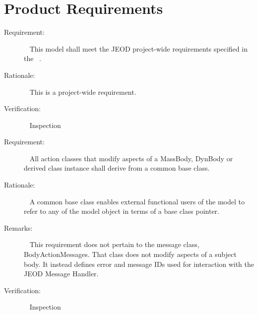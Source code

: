 %

\chapter{Product Requirements}
\label{ch:overview:reqt}

\label{reqt:overview:top_level}
\begin{description}
\item[Requirement:]\ \newline
  This model shall meet the JEOD project-wide requirements specified in
  the \JEODid\ .

\item[Rationale:]\ \newline
  This is a project-wide requirement.

\item[Verification:]\ \newline
  Inspection
\end{description}


\label{reqt:overview:base_class}
\begin{description}
\item[Requirement:]\ \newline
  All action classes that modify aspects of a MassBody, DynBody or derived class instance
  shall derive from a common base class.

\item[Rationale:]\ \newline
  A common base class enables external functional users of the
  model to refer to any of the model object in terms of a base
  class pointer.

\item[Remarks:]\ \newline
  This requirement does not pertain to the \ModelDesc message class,
  BodyActionMessages. That class does not modify aspects of a subject body.
  It instead defines error and message IDs used
  for interaction with the JEOD Message Handler.

\item[Verification:]\ \newline
  Inspection
\end{description}

